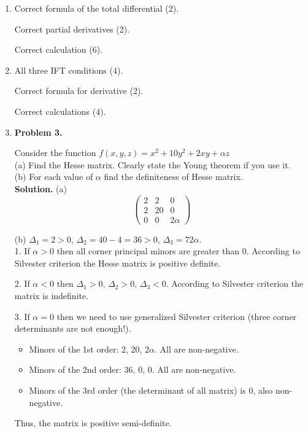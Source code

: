 \begin{enumerate}
  \item Correct formula of the total differential (2).

Correct partial derivatives (2).

Correct calculation (6).

  \item All three IFT conditions (4).

Correct formula for derivative (2).

Correct calculations (4).

  \item \textbf{Problem 3.}

  Consider the function $f(x,y,z)=x^2+10y^2+2xy+\alpha z$\\
  (a) Find the Hesse matrix. Clearly state the Young theorem if you use it.\\
  (b) For each value of $\alpha$ find the definiteness of Hesse matrix.\\

  \textbf{Solution.}
  (a)\;
  \[
  \begin{pmatrix}
  2& 2 &0\\
  2 &20& 0\\
  0& 0& 2\alpha
  \end{pmatrix}
  \]

  (b) $\Delta_1=2>0$, $\Delta_2=40-4=36>0$, $\Delta_3=72\alpha$.\\
  1. If $\alpha >0$ then all corner principal minors are greater than 0. According to Silvester criterion the Hesse matrix is positive definite.

  2. If $\alpha<0$ then $\Delta_1>0$, $\Delta_2>0$, $\Delta_3<0$. According to Silvester criterion the matrix is indefinite.

  3. If $\alpha=0$ then we need to use generalized Silvester criterion (three corner determinants are not enough!).

  \begin{itemize}
  \item Minors of the 1st order: 2, 20, $2\alpha$. All are non-negative.
  \item Minors of the 2nd order: 36, 0, 0. All are non-negative.
  \item Minors of the 3rd order (the determinant of all matrix) is 0, also non-negative.
  \end{itemize}

  Thus, the matrix is positive semi-definite.
  \smallskip


\end{enumerate}
